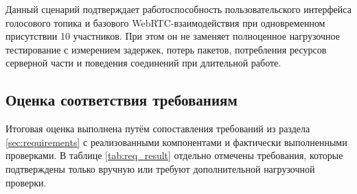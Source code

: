 \documentclass[a4paper,12pt]{extarticle}
\begin{document}
Данный сценарий подтверждает работоспособность пользовательского интерфейса голосового топика и базового WebRTC-взаимодействия при одновременном присутствии 10 участников. При этом он не заменяет полноценное нагрузочное тестирование с измерением задержек, потерь пакетов, потребления ресурсов серверной части и поведения соединений при длительной работе.

\subsection{Оценка соответствия требованиям}

Итоговая оценка выполнена путём сопоставления требований из раздела \ref{sec:requirements} с реализованными компонентами и фактически выполненными проверками. В таблице \ref{tab:req_result} отдельно отмечены требования, которые подтверждены только вручную или требуют дополнительной нагрузочной проверки.
\end{document}
